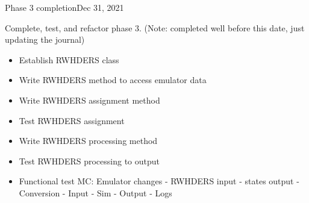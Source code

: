 \begin{entry}{Phase 3 completion}{Dec 31, 2021}
    \objective 
    
    Complete, test, and refactor phase 3. (Note: completed well before this date, just updating the journal)


    \outline

    \begin{itemize}
        \item Establish RWHDERS class
        \item Write RWHDERS method to access emulator data
        \item Write RWHDERS assignment method
        \item Test RWHDERS assignment
        \item Write RWHDERS processing method
        \item Test RWHDERS processing to output
        \item Functional test MC: Emulator changes - RWHDERS input - states output - Conversion - Input - Sim - Output - Logs
    \end{itemize}

    \procedures


\end{entry}
